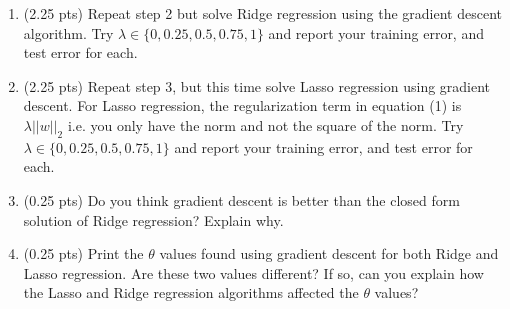\documentclass[10pt,letter,notitlepage]{article}
\newcounter{exercise}
\begin{document}
\begin{exercise}
\begin{enumerate}
\item (2.25 pts) Repeat step 2 but solve Ridge regression using the gradient descent algorithm. Try $\lambda \in \{0, 0.25, 0.5, 0.75, 1\}$ and report your training error, and test error for each.

\item (2.25 pts) Repeat step 3, but this time solve Lasso regression using gradient descent. For Lasso regression, the regularization term in equation (1) is $\lambda ||w||_2$ i.e. you only have the norm and not the square of the norm. Try $\lambda \in \{0, 0.25, 0.5, 0.75, 1\}$ and report your training error, and test error for each.

\item (0.25 pts) Do you think gradient descent is better than the closed form solution of Ridge regression? Explain why.

\item (0.25 pts) Print the $\theta$ values found using gradient descent for both Ridge and Lasso regression. Are these two values different? If so, can you explain how the Lasso and Ridge regression algorithms affected the $\theta$ values?
\end{enumerate}
\end{exercise}
\end{document}
